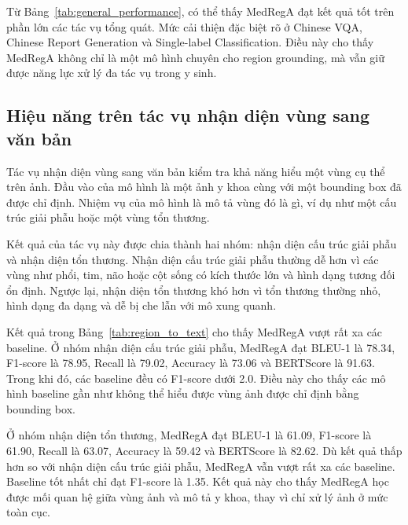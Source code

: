 \documentclass[12pt,a4paper,oneside]{extarticle}
\begin{document}
Từ Bảng~\ref{tab:general_performance}, có thể thấy MedRegA đạt kết quả tốt trên phần lớn các tác vụ tổng quát. Mức cải thiện đặc biệt rõ ở Chinese VQA, Chinese Report Generation và Single-label Classification. Điều này cho thấy MedRegA không chỉ là một mô hình chuyên cho region grounding, mà vẫn giữ được năng lực xử lý đa tác vụ trong y sinh.

\subsection{Hiệu năng trên tác vụ nhận diện vùng sang văn bản}

Tác vụ nhận diện vùng sang văn bản kiểm tra khả năng hiểu một vùng cụ thể trên ảnh. Đầu vào của mô hình là một ảnh y khoa cùng với một bounding box đã được chỉ định. Nhiệm vụ của mô hình là mô tả vùng đó là gì, ví dụ như một cấu trúc giải phẫu hoặc một vùng tổn thương.

Kết quả của tác vụ này được chia thành hai nhóm: nhận diện cấu trúc giải phẫu và nhận diện tổn thương. Nhận diện cấu trúc giải phẫu thường dễ hơn vì các vùng như phổi, tim, não hoặc cột sống có kích thước lớn và hình dạng tương đối ổn định. Ngược lại, nhận diện tổn thương khó hơn vì tổn thương thường nhỏ, hình dạng đa dạng và dễ bị che lẫn với mô xung quanh.

Kết quả trong Bảng~\ref{tab:region_to_text} cho thấy MedRegA vượt rất xa các baseline. Ở nhóm nhận diện cấu trúc giải phẫu, MedRegA đạt BLEU-1 là 78.34, F1-score là 78.95, Recall là 79.02, Accuracy là 73.06 và BERTScore là 91.63. Trong khi đó, các baseline đều có F1-score dưới 2.0. Điều này cho thấy các mô hình baseline gần như không thể hiểu được vùng ảnh được chỉ định bằng bounding box.

Ở nhóm nhận diện tổn thương, MedRegA đạt BLEU-1 là 61.09, F1-score là 61.90, Recall là 63.07, Accuracy là 59.42 và BERTScore là 82.62. Dù kết quả thấp hơn so với nhận diện cấu trúc giải phẫu, MedRegA vẫn vượt rất xa các baseline. Baseline tốt nhất chỉ đạt F1-score là 1.35. Kết quả này cho thấy MedRegA học được mối quan hệ giữa vùng ảnh và mô tả y khoa, thay vì chỉ xử lý ảnh ở mức toàn cục.
\end{document}
